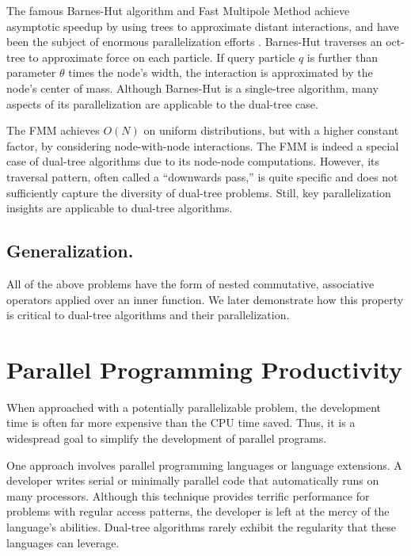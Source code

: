 \documentclass[twoside,leqno,twocolumn]{article}
\newcommand{\mysub}[1]{\subsection{#1.}}
\begin{document}
The famous Barnes-Hut algorithm \cite{barnes_hut} and Fast Multipole Method \cite{greengard_fmm} achieve asymptotic speedup by using trees to approximate distant interactions, and have been the subject of enormous parallelization efforts \cite{singh_thesis, salmon_thesis, liu94experiences, salmon97parallel,singh92implications, singh95load, warren95portable}.
Barnes-Hut \cite{barnes_hut} traverses an oct-tree to approximate force on each particle.
If query particle $q$ is further than parameter $\theta$ times the node's width, the interaction is approximated by the node's center of mass.
Although Barnes-Hut is a single-tree algorithm, many aspects of its parallelization are applicable to the dual-tree case.

The FMM \cite{greengard_fmm} achieves $O(N)$ on uniform distributions, but with a higher constant factor, by considering node-with-node interactions.
The FMM is indeed a special case of dual-tree algorithms due to its node-node computations.
However, its traversal pattern, often called a ``downwards pass,'' is quite specific and does not sufficiently capture the diversity of dual-tree problems.
Still, key parallelization insights are applicable to dual-tree algorithms.

\mysub{Generalization}
All of the above problems have the form of nested commutative, associative operators applied over an inner function.
We later demonstrate how this property is critical to dual-tree algorithms and their parallelization.


\section{Parallel Programming Productivity}

When approached with a potentially parallelizable problem, the development time is often far more expensive than the CPU time saved.
Thus, it is a widespread goal to simplify the development of parallel programs.

One approach involves parallel programming languages or language extensions.
A developer writes serial or minimally parallel code that automatically runs on many processors.
Although this technique provides terrific performance for problems with regular access patterns, the developer is left at the mercy of the language's abilities.
Dual-tree algorithms rarely exhibit the regularity that these languages can leverage.
\end{document}
